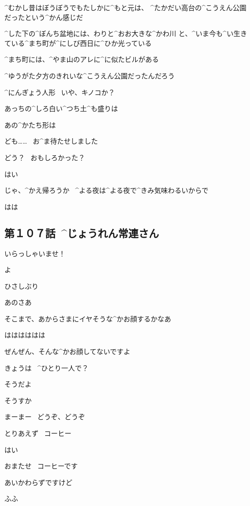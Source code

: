 \page[95]
\Ayase ^{むかし}{昔}はぼうぼうでもたしかに^{もと}{元}は、
^{たかだい}{高台}の^{こうえん}{公園}だったという^{かん}{感}じだ

\Ayase ^{した}{下}の^{ぼんち}{盆地}には、わりと^{おお}{大}きな^{かわ}{川}
と、^{いま}{今}も^{い}{生}きている^{まち}{町}が^{にしび}{西日}に^{ひか}{光}っている

\Ayase ^{まち}{町}には、^{やま}{山}のアレに^{に}{似}たビルがある

\Ayase ^{ゆうがた}{夕方}のきれいな^{こうえん}{公園}だったんだろう

\page[97]
\Ayase ^{にんぎょう}{人形}
\ いや、キノコか？

\Ayase あっちの^{しろ}{白}い^{つち}{土}^{も}{盛}りは

\Takahiro あの^{かたち}{形}は

\page[98]
\Ayase ども……
\ お^{ま}{待}たせしました

\Person どう？
\ おもしろかった？

\Ayase はい

\Person じゃ、^{かえ}{帰}ろうか
\ ^{よる}{夜}は^{よる}{夜}で^{きみ}{気味}わるいからで

\Ayase はは


\subsection{第１０７話\ ^{じょうれん}{常連}さん}

\page[103]
\Alpha いらっしゃいませ！

\page[104]
\Maruko よ

\Alpha ひさしぶり

\Maruko あのさあ

\Maruko そこまで、あからさまにイヤそうな^{かお}{顔}するかなあ

\Alpha はははははは

\Alpha ぜんぜん、そんな^{かお}{顔}してないですよ

\page[105]
\Alpha きょうは
\ ^{ひとり}{一人}で？

\Maruko そうだよ

\Alpha そうすか

\Alpha まーまー
\ どうぞ、どうぞ

\Maruko とりあえず
\ コーヒー

\Alpha はい

\page[107]
\Alpha おまたせ
\ コーヒーです

\Alpha あいかわらずですけど

\page[108]
\Maruko ふふ

